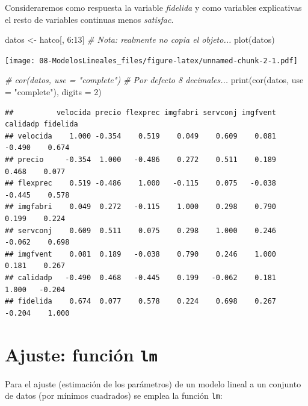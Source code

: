 \documentclass[
]{book}
\newenvironment{Shaded}{\begin{snugshade}}{\end{snugshade}}
\newcommand{\AttributeTok}[1]{\textcolor[rgb]{0.77,0.63,0.00}{#1}}
\newcommand{\CommentTok}[1]{\textcolor[rgb]{0.56,0.35,0.01}{\textit{#1}}}
\newcommand{\DecValTok}[1]{\textcolor[rgb]{0.00,0.00,0.81}{#1}}
\newcommand{\FunctionTok}[1]{\textcolor[rgb]{0.00,0.00,0.00}{#1}}
\newcommand{\NormalTok}[1]{#1}
\newcommand{\OtherTok}[1]{\textcolor[rgb]{0.56,0.35,0.01}{#1}}
\newcommand{\SpecialCharTok}[1]{\textcolor[rgb]{0.00,0.00,0.00}{#1}}
\newcommand{\StringTok}[1]{\textcolor[rgb]{0.31,0.60,0.02}{#1}}
\theoremstyle{break}
\theoremstyle{nonumberplain}
\begin{document}
Consideraremos como respuesta la variable \emph{fidelida} y como variables explicativas
el resto de variables continuas menos \emph{satisfac}.

\begin{Shaded}
\begin{Highlighting}[]
\NormalTok{datos }\OtherTok{\textless{}{-}}\NormalTok{ hatco[, }\DecValTok{6}\SpecialCharTok{:}\DecValTok{13}\NormalTok{]  }\CommentTok{\# Nota: realmente no copia el objeto...}
\FunctionTok{plot}\NormalTok{(datos)}
\end{Highlighting}
\end{Shaded}

\texttt{[image: 08-ModelosLineales\_files/figure-latex/unnamed-chunk-2-1.pdf]}

\begin{Shaded}
\begin{Highlighting}[]
\CommentTok{\# cor(datos, use = "complete") \# Por defecto 8 decimales...}
\FunctionTok{print}\NormalTok{(}\FunctionTok{cor}\NormalTok{(datos, }\AttributeTok{use =} \StringTok{"complete"}\NormalTok{), }\AttributeTok{digits =} \DecValTok{2}\NormalTok{)}
\end{Highlighting}
\end{Shaded}

\begin{verbatim}
##          velocida precio flexprec imgfabri servconj imgfvent calidadp fidelida
## velocida    1.000 -0.354    0.519    0.049    0.609    0.081   -0.490    0.674
## precio     -0.354  1.000   -0.486    0.272    0.511    0.189    0.468    0.077
## flexprec    0.519 -0.486    1.000   -0.115    0.075   -0.038   -0.445    0.578
## imgfabri    0.049  0.272   -0.115    1.000    0.298    0.790    0.199    0.224
## servconj    0.609  0.511    0.075    0.298    1.000    0.246   -0.062    0.698
## imgfvent    0.081  0.189   -0.038    0.790    0.246    1.000    0.181    0.267
## calidadp   -0.490  0.468   -0.445    0.199   -0.062    0.181    1.000   -0.204
## fidelida    0.674  0.077    0.578    0.224    0.698    0.267   -0.204    1.000
\end{verbatim}

\hypertarget{ajuste-funciuxf3n-lm}{%
\section{\texorpdfstring{Ajuste: función \texttt{lm}}{Ajuste: función lm}}\label{ajuste-funciuxf3n-lm}}

Para el ajuste (estimación de los parámetros) de un modelo lineal a un conjunto de datos (por mínimos cuadrados) se emplea la función \texttt{lm}:
\end{document}
